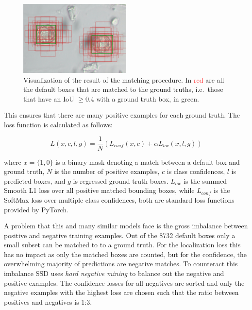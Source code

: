\begin{figure}[htb]
  \centering
  \includegraphics[width=0.5\textwidth]{figs/priors_matching}
  \caption[Default box matching]{Visualization of the result of the matching procedure.
In \textcolor{red}{red} are all the default boxes that are matched to the ground truths, i.e.~those that have an IoU \( \geq 0.4 \) with a ground truth box, in \textcolor{nicegreen}{green}.}\label{fig:priors}
\end{figure}

This ensures that there are many positive examples for each ground truth.
The loss function is calculated as follows:

\[L(x,c,l,g)=\frac{1}{N}\left( L_{conf}(x,c) + \alpha L_{loc}(x,l,g)\right) \]

where \( x=\{1,0\} \) is a binary mask denoting a match between a default box and ground truth, \( N \) is the number of positive examples, \( c \) is class confidences, \( l \) is predicted boxes, and \( g \) is regressed ground truth boxes.  \( L_{loc} \) is the summed Smooth L1 loss over all positive matched bounding boxes, while \( L_{conf} \) is the SoftMax loss over multiple class confidences, both are standard loss functions provided by PyTorch.

A problem that this and many similar models face is the gross imbalance between positive and negative training examples.
Out of the 8732 default boxes only a small subset can be matched to to a ground truth.
For the localization loss this has no impact as only the matched boxes are counted, but for the confidence, the overwhelming majority of predictions are negative matches.
To counteract this imbalance SSD uses \textit{hard negative mining} to balance out the negative and positive examples.
The confidence losses for all negatives are sorted and only the negative examples with the highest loss are chosen such that the ratio between positives and negatives is 1:3.


